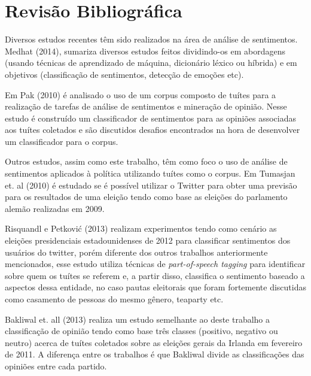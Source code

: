 \chapter{Revisão Bibliográfica}

Diversos estudos recentes têm sido realizados na área de análise de sentimentos.
Medhat (2014)\citep{medhat2014}, sumariza diversos estudos feitos dividindo-os em
abordagens (usando técnicas de aprendizado de máquina, dicionário léxico ou
híbrida) e em objetivos (classificação de sentimentos, detecção de emoções etc).

Em Pak (2010)\citep{pak2010} é analisado o uso de um corpus composto de tuítes para
a realização de tarefas de análise de sentimentos e mineração de opinião. Nesse estudo
é construído um classificador de sentimentos para as opiniões associadas aos tuítes coletados
e são discutidos desafios encontrados na hora de desenvolver um classificador para o corpus.

Outros estudos, assim como este trabalho, têm como foco o uso de análise de sentimentos
aplicados à política utilizando tuítes como o corpus. Em Tumasjan et. al (2010)\citep{tumasjan2010} é estudado
se é possível utilizar o Twitter para obter uma previsão para os resultados de uma eleição
tendo como base as eleições do parlamento alemão realizadas em 2009.

Risquandl e Petković (2013)\citep{petkovic2013} realizam experimentos tendo como cenário as
eleições presidenciais estadounidenses de 2012 para classificar sentimentos dos usuários do
twitter, porém diferente dos outros trabalhos anteriormente mencionados, esse estudo utiliza
técnicas de \textit{part-of-speech tagging} para identificar sobre quem os tuítes se referem e, a
partir disso, classifica o sentimento baseado a aspectos dessa entidade, no caso pautas eleitorais
que foram fortemente discutidas como casamento de pessoas do mesmo gênero, teaparty etc.

Bakliwal et. all (2013)\citep{bakliwal2013} realiza um estudo semelhante ao deste trabalho a classificação de opinião
tendo como base três classes (positivo, negativo ou neutro) acerca de tuítes coletados sobre
as eleições gerais da Irlanda em fevereiro de 2011. A diferença entre os trabalhos é que Bakliwal
divide as classificações das opiniões entre cada partido.


